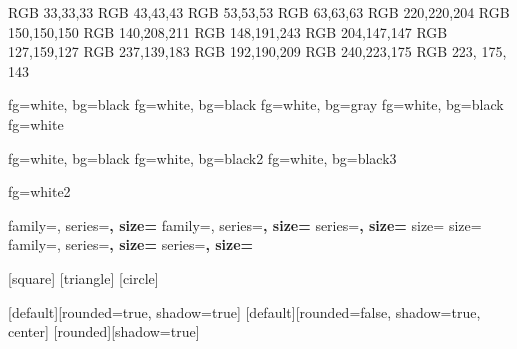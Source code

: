 
\definecolor{black}   {RGB} {33,33,33}
\definecolor{black2}  {RGB} {43,43,43}
\definecolor{black3}  {RGB} {53,53,53}
\definecolor{gray}    {RGB} {63,63,63}
\definecolor{white}   {RGB} {220,220,204}
\definecolor{white2}  {RGB} {150,150,150}
\definecolor{cyan}    {RGB} {140,208,211}
\definecolor{blue}    {RGB} {148,191,243}
\definecolor{red}     {RGB} {204,147,147} 
\definecolor{green}   {RGB} {127,159,127}
\definecolor{magenta} {RGB} {237,139,183}
\definecolor{purple}  {RGB} {192,190,209}
\definecolor{yellow}  {RGB} {240,223,175}
\definecolor{orange}  {RGB} {223, 175, 143}


          {fg=white, bg=black}
     {fg=white, bg=black}
    {fg=white, bg=gray} 
           {fg=white, bg=black} 
 {fg=white}

   {fg=white, bg=black}
 {fg=white, bg=black2}
      {fg=white, bg=black3}

           {fg=white2}

          {family=\sffamily, series=\bfseries, size=\Large}
       {family=\sffamily, series=\bfseries, size=\large}
         {series=\bfseries, size=\normalsize}
      {size=\small}
           {size=\scriptsize} 
     {family=\sffamily, series=\bfseries, size=\Large}
 {series=\bfseries, size=\large}


[square]
[triangle]
[circle]

\setlength{\leftmargini}{0pt}

[default][rounded=true, shadow=true]
[default][rounded=false, shadow=true, center]
[rounded][shadow=true] 


